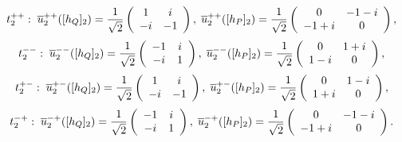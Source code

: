 \documentclass[12pt]{iopart}
\begin{document}
\begin{equation}
\hspace{-23mm}
t_2^{++}:
\hspace{1mm}
\overline u_2^{++}([h_Q]_2)=\frac1{\sqrt2}\left(\begin{array}{cc}
 1 &  i  \\
-i & -1 \\
\end{array}\right),
\hspace{1mm}
\overline u_2^{++}([h_P]_2)=\frac1{\sqrt2}\left(\begin{array}{cc}
 0   & -1-i \\
-1+i &  0   \\
\end{array}\right),
\end{equation}
\begin{equation}
\hspace{-23mm}
t_2^{--}:
\hspace{1mm}
\overline u_2^{--}([h_Q]_2)=\frac1{\sqrt2}\left(\begin{array}{cc}
-1 &  i  \\
-i &  1 \\
\end{array}\right),
\hspace{1mm}
\overline u_2^{--}([h_P]_2)=\frac1{\sqrt2}\left(\begin{array}{cc}
 0   &  1+i \\
 1-i &  0   \\
\end{array}\right),
\end{equation}
\begin{equation}
\hspace{-23mm}
t_2^{+-}:
\hspace{1mm}
\overline u_2^{+-}([h_Q]_2)=\frac1{\sqrt2}\left(\begin{array}{cc}
 1 &  i  \\
-i & -1 \\
\end{array}\right),
\hspace{1mm}
\overline u_2^{+-}([h_P]_2)=\frac1{\sqrt2}\left(\begin{array}{cc}
 0   &  1-i \\
 1+i &  0   \\
\end{array}\right),
\end{equation}
\begin{equation}
\hspace{-23mm}
t_2^{-+}:
\hspace{1mm}
\overline u_2^{-+}([h_Q]_2)=\frac1{\sqrt2}\left(\begin{array}{cc}
-1 &  i  \\
-i &  1 \\
\end{array}\right),
\hspace{1mm}
\overline u_2^{-+}([h_P]_2)=\frac1{\sqrt2}\left(\begin{array}{cc}
 0   & -1-i \\
-1+i &  0   \\
\end{array}\right).
\end{equation}
\end{document}
